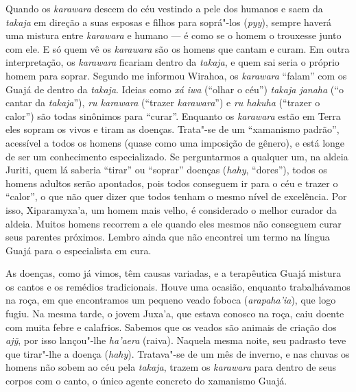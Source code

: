 Quando os \emph{karawara} descem do céu vestindo a pele dos humanos e
saem da \emph{takaja} em direção a suas esposas e filhos para soprá"-los
(\emph{pyy}), sempre haverá uma mistura entre \emph{karawara} e humano ---
é como se o homem o trouxesse junto com ele. E só quem vê os
\emph{karawara} são os homens que cantam e curam. Em outra
interpretação, os \emph{karawara} ficariam dentro da \emph{takaja}, e
quem sai seria o próprio homem para soprar. Segundo me informou Wirahoa,
os \emph{karawara} ``falam'' com os Guajá de dentro da \emph{takaja}.
Ideias como \emph{xá} \emph{iwa} (``olhar o céu'') \emph{takaja janaha}
(``o cantar da \emph{takaja}''), \emph{ru karawara} (``trazer
\emph{karawara}'') e \emph{ru hakuha} (``trazer o calor'') são todas
sinônimos para ``curar''. Enquanto os \emph{karawara} estão em Terra eles
sopram os vivos e tiram as doenças. Trata"-se de um ``xamanismo padrão'',
acessível a todos os homens (quase como uma imposição de gênero), e está
longe de ser um conhecimento especializado. Se perguntarmos a qualquer
um, na aldeia Juriti, quem lá saberia ``tirar'' ou ``soprar'' doenças
(\emph{hahy}, ``dores''), todos os homens adultos serão apontados, pois
todos conseguem ir para o céu e trazer o ``calor'', o que não quer dizer
que todos tenham o mesmo nível de excelência. Por isso, Xiparamyxa'a, um
homem mais velho, é considerado o melhor curador da aldeia. Muitos
homens recorrem a ele quando eles mesmos não conseguem curar seus
parentes próximos. Lembro ainda que não encontrei um termo na língua
Guajá para o especialista em cura.

As doenças, como já vimos, têm causas variadas, e a terapêutica Guajá
mistura os cantos e os remédios tradicionais. Houve uma ocasião,
enquanto trabalhávamos na roça, em que encontramos um pequeno veado
foboca (\emph{arapaha'ia}), que logo fugiu. Na mesma tarde, o jovem
Juxa'a, que estava conosco na roça, caiu doente com muita febre e
calafrios. Sabemos que os veados são animais de criação dos \emph{ajỹ},
por isso lançou"-lhe \emph{ha'aera} (raiva). Naquela mesma noite, seu
padrasto teve que tirar"-lhe a doença (\emph{hahy}). Tratava"-se de um mês
de inverno, e nas chuvas os homens não sobem ao céu pela \emph{takaja},
trazem os \emph{karawara} para dentro de seus corpos com o canto, o
único agente concreto do xamanismo Guajá.

